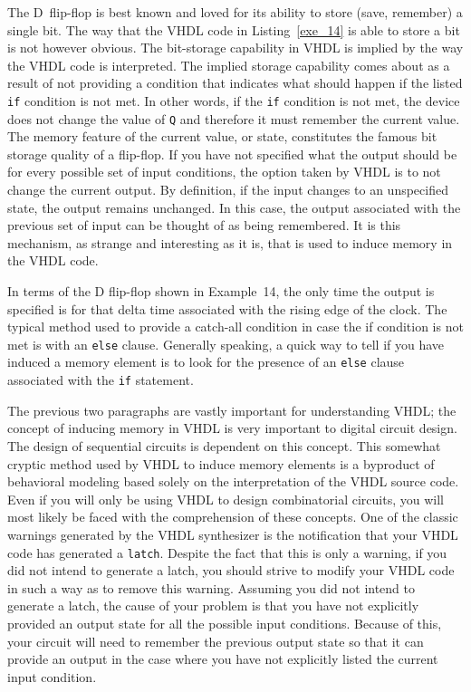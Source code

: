 The D~flip-flop is best known and loved for its ability to store (save, remember) a single bit. The way that the VHDL code in Listing~\ref{exe_14} is able to store a bit is not however obvious. The bit-storage capability in VHDL is implied by the way the VHDL code is interpreted. The implied storage capability comes about as a result of not providing a condition that indicates what should happen if the listed \texttt{if} condition is not met. In other words, if the \texttt{if} condition is not met, the device does not change the value of \texttt{Q} and therefore it must remember the current value. The memory feature of the current value, or state, constitutes the famous bit storage quality of a flip-flop. If you have not specified what the output should be for every possible set of input conditions, the option taken by VHDL is to not change the current output. By definition, if the input changes to an unspecified state, the output remains unchanged. In this case, the output associated with the previous set of input can be thought of as being remembered. It is this mechanism, as strange and interesting as it is, that is used to induce memory in the VHDL code.

In terms of the D flip-flop shown in Example~14, the only time the output is specified is for that delta time associated with the rising edge of the clock. The typical method used to provide a catch-all condition in case the if condition is not met is with an \texttt{else} clause. Generally speaking, a quick way to tell if you have induced a memory element is to look for the presence of an \texttt{else} clause associated with the \texttt{if} statement.

The previous two paragraphs are vastly important for understanding VHDL; the concept of inducing memory in VHDL is very important to digital circuit design. The design of sequential circuits is dependent on this concept. This somewhat cryptic method used by VHDL to induce memory elements is a byproduct of behavioral modeling based solely on the interpretation of the VHDL source code. Even if you will only be using VHDL to design combinatorial circuits, you will most likely be faced with the comprehension of these concepts. One of the classic warnings generated by the VHDL synthesizer is the notification that your VHDL code has generated a \texttt{latch}. Despite the fact that this is only a warning, if you did not intend to generate a latch, you should strive to modify your VHDL code in such a way as to remove this warning. Assuming you did not intend to generate a latch, the cause of your problem is that you have not explicitly provided an output state for all the possible input conditions. Because of this, your circuit will need to remember the previous output state so that it can provide an output in the case where you have not explicitly listed the current input condition.

